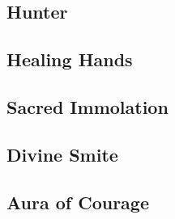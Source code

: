 
\begin{multicols*}{2}

\section{Hunter}

\subsection*{Healing Hands}

\subsection*{Sacred Immolation}

\subsection*{Divine Smite}

\subsection*{Aura of Courage}

    
\end{multicols*}


\clearpage


